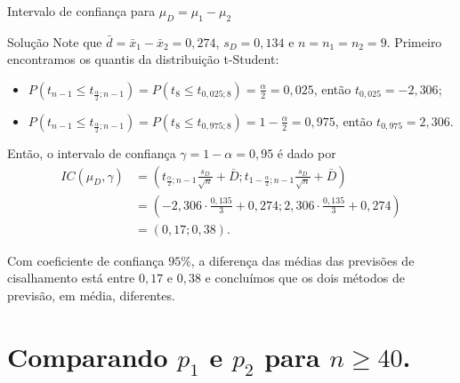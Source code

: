 \documentclass[9pt]{beamer}
\begin{document}
\begin{frame}{Intervalo de confiança para $\mu_D=\mu_1 - \mu_2$}

\small
\begin{block}{Solução}
Note que $\bar{d} = \bar{x}_1-\bar{x}_2 = 0,274$, $s_D = 0,134$ e $n=n_1=n_2=9$. Primeiro encontramos os quantis da distribuição t-Student:
\begin{itemize}
\item $P(t_{n-1} \leq t_{\frac{\alpha}{2}; n-1}) = P(t_{8} \leq t_{0,025; 8}) = \frac{\alpha}{2} = 0,025$, então $t_{0,025} =-2,306$;
\item $P(t_{n-1} \leq t_{\frac{\alpha}{2}; n-1}) = P(t_{8} \leq t_{0,975; 8}) =1- \frac{\alpha}{2} = 0,975$, então $t_{0,975} =2,306$.
\end{itemize}	

Então, o intervalo de confiança $\gamma=1-\alpha = 0,95$ é dado por
\begin{align*}
IC(\mu_D, \gamma) &= \left( t_{\frac{\alpha}{2};n-1} \frac{s_D }{\sqrt{n}}  + \bar{D}; t_{1-\frac{\alpha}{2};n-1} \frac{s_D }{\sqrt{n}}   + \bar{D}  \right)\\
&= \left( -2,306 \cdot \frac{0,135}{3} + 0,274; 2,306 \cdot \frac{0,135}{3} + 0,274 \right)\\
&= \left( 0,17; 0,38  \right).
\end{align*}

Com coeficiente de confiança $95\%$, a diferença das médias das previsões de cisalhamento está entre $0,17$ e $0,38$ e  concluímos que os dois métodos de previsão, em média, diferentes.
\end{block}
\normalsize

\end{frame}


\section{Comparando $p_1$ e $p_2$ para $n \geq 40$.}
\end{document}
